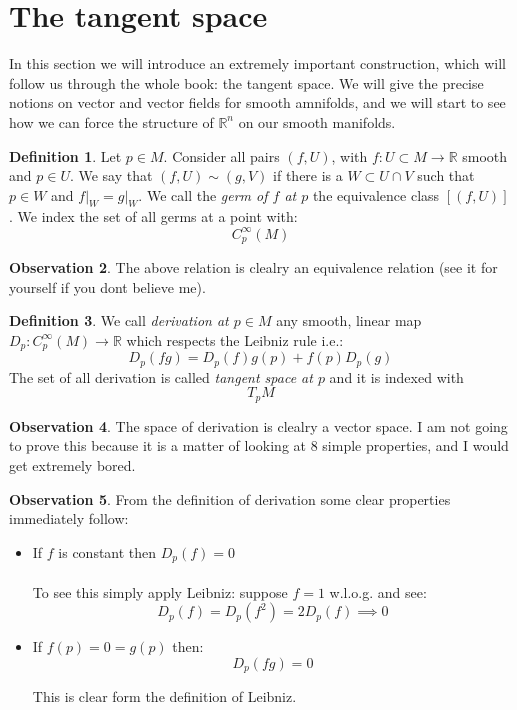 \documentclass[12pt,a4paper]{report}
\theoremstyle{definition}
\newtheorem{Def}{Definition}[chapter]
\theoremstyle{Theorem}
\theoremstyle{break}
\theoremstyle{definition}
\newtheorem{Obs}[Def]{Observation}
\begin{document}
			\section{The tangent space}
			In this section we will introduce an extremely important construction, which will follow us through the whole book: the tangent space. We will give the precise notions on vector and vector fields for smooth amnifolds, and we will start to see how we can force the structure of $\mathbb{R}^n$ on our smooth manifolds.
			\begin{Def}
				Let $p\in M$. Consider all pairs $(f,U)$, with $f:U\subset M\rightarrow \mathbb{R}$ smooth and $p\in U$. We say that $(f,U)\sim (g,V)$ if there is a $W\subset U\cap V$ such that $p\in W$ and $f\big|_W=g\big|_W$.
				We call the \textit{germ of $f$ at $p$} the equivalence class $[(f,U)]$. We index the set of all germs at a point with:
				$$C^\infty_p(M)$$
			\end{Def}
			\begin{Obs}
				The above relation is clealry an equivalence relation (see it for yourself if you dont believe me).
			\end{Obs}
			\begin{Def}
				We call \textit{derivation at $p\in M$} any smooth, linear map $D_p:C_p^\infty(M)\rightarrow \mathbb{R}$ which respects the Leibniz rule i.e.:
				$$D_p(fg)=D_p(f)g(p)+f(p)D_p(g)$$
				The set of all derivation is called \textit{tangent space at $p$} and it is indexed with $$T_pM$$
			\end{Def}
			\begin{Obs}
				The space of derivation is clealry a vector space. I am not going to prove this because it is a matter of looking at 8 simple properties, and I would get extremely bored.
			\end{Obs}
			\begin{Obs}
				From the definition of derivation some clear properties immediately follow:
				\begin{itemize}
					\item If $f$ is constant then $D_p(f)=0$
					\\\\
					To see this simply apply Leibniz: suppose $f=1$ w.l.o.g. and see:
					$$D_p(f)=D_p(f^2)=2D_p(f)\implies 0$$
					\item  If $f(p)=0=g(p)$ then:
					$$D_p(fg)=0$$
					
					This is clear form the definition of Leibniz.
				\end{itemize}
			\end{Obs}
\end{document}
